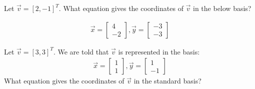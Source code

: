 

\begin{enumerate}

\qitem Let $\vec{v} = [2,-1]^{T}$. What equation gives the coordinates of $\vec{v}$ in the below basis?

\begin{gather*}
\vec{x} = 
\begin{bmatrix}
4 \\
-2
\end{bmatrix},
\vec{y} = \begin{bmatrix}
-3 \\
-3
\end{bmatrix}
\end{gather*}



\qitem Let $\vec{v} = [3,3]^{T}$. We are told that $\vec{v}$ is represented in the basis:
\begin{gather*}
\vec{x} = 
\begin{bmatrix}
1 \\
1
\end{bmatrix},
\vec{y} = \begin{bmatrix}
1 \\
-1
\end{bmatrix}
\end{gather*}
What equation gives the coordinates of $\vec{v}$ in the standard basis?


\bigskip

\begin{adjustwidth}{-20pt}{0pt}


\end{adjustwidth}
\end{enumerate}
